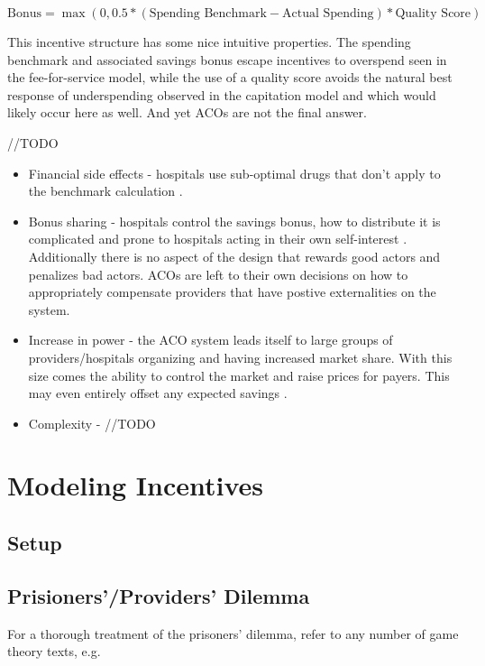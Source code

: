 \documentclass{article}
\begin{document}
\begin{equation}
    \text{Bonus} = \max (0, 0.5 * (\text{Spending Benchmark} - \text{Actual Spending}) * \text{Quality Score})
\end{equation}

This incentive structure has some nice intuitive properties. The spending benchmark and associated savings bonus escape incentives to overspend seen in the fee-for-service model, while the use of a quality score avoids the natural best response of underspending observed in the capitation model and which would likely occur here as well. And yet ACOs are not the final answer.

//TODO
\begin{itemize}
    \item Financial side effects - hospitals use sub-optimal drugs that don't apply to the benchmark calculation \cite{acoethics}.
    \item Bonus sharing - hospitals control the savings bonus, how to distribute it is complicated and prone to hospitals acting in their own self-interest \cite{inflation}. Additionally there is no aspect of the design that rewards good actors and penalizes bad actors. ACOs are left to their own decisions on how to appropriately compensate providers that have postive externalities on the system.
    \item Increase in power - the ACO system leads itself to large groups of providers/hospitals organizing and having increased market share. With this size comes the ability to control the market and raise prices for payers. This may even entirely offset any expected savings \cite{acoecon}.
    \item Complexity - //TODO
\end{itemize}

\section*{Modeling Incentives}

\subsection*{Setup}

\subsection*{Prisioners'/Providers' Dilemma}
For a thorough treatment of the prisoners' dilemma, refer to any number of game theory texts, e.g. \cite{networks}
\end{document}
